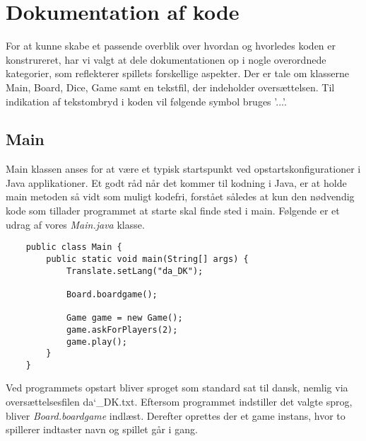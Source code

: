 \chapter{Dokumentation af kode}

\noindent For at kunne skabe et passende overblik over hvordan og hvorledes koden er konstrureret, har vi valgt at dele dokumentationen op i nogle overordnede kategorier, som reflekterer spillets forskellige aspekter. Der er tale om klasserne Main, Board, Dice, Game samt en tekstfil, der indeholder oversættelsen.
Til indikation af tekstombryd i koden vil følgende symbol bruges '...'.\\

\section{Main}
\noindent Main klassen anses for at være et typisk startspunkt ved opstartskonfigurationer i Java applikationer. 
Et godt råd når det kommer til kodning i Java, er at holde main metoden så vidt som muligt kodefri, forstået således at kun den nødvendig kode som tillader programmet at starte skal finde sted i main. 
Følgende er et udrag af vores \textit{Main.java} klasse.\\

\begin{lstlisting}
    public class Main {
        public static void main(String[] args) {
            Translate.setLang("da_DK");
    
            Board.boardgame();
    
            Game game = new Game();
            game.askForPlayers(2);
            game.play();
        }
    }
\end{lstlisting}
\vspace{2ex}

\noindent Ved programmets opstart bliver sproget som standard sat til dansk, nemlig via oversættelsesfilen da\char`_DK.txt. 
Eftersom programmet indstiller det valgte sprog, bliver \textit{Board.boardgame} indlæst. 
Derefter oprettes der et game instans, hvor to spillerer indtaster navn og spillet går i gang.\\

